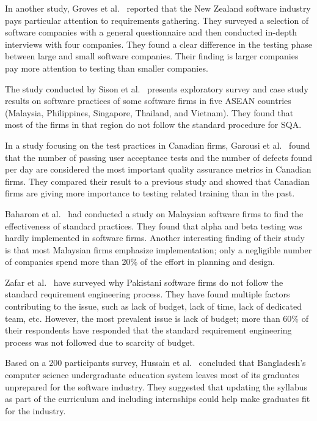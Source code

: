 In another study, Groves et al.~\cite{Groves2000} reported that the New Zealand software industry pays particular attention to requirements gathering. They surveyed a selection of software companies with a general questionnaire and then conducted in-depth interviews with four companies. They found a clear difference in the testing phase between large and small software companies. Their finding is larger companies pay more attention to testing than smaller companies.

The study conducted by Sison et al.~\cite{Sison2006} presents exploratory survey and case study results on software practices of some software firms in five ASEAN countries (Malaysia, Philippines, Singapore, Thailand, and Vietnam). They found that most of the firms in that region do not follow the standard procedure for SQA.

In a study focusing on the test practices in Canadian firms, Garousi et al.~\cite{Garousi2013} found that the number of passing user acceptance tests and the number of defects found per day are considered the most important quality assurance metrics in Canadian firms. They compared their result to a previous study and showed that Canadian firms are giving more importance to testing related training than in the past.

Baharom et al.~\cite{Baharom2006} had conducted a study on Malaysian software firms to find the effectiveness of standard practices. They found that alpha and beta testing was hardly implemented in software firms. Another interesting finding of their study is that most Malaysian firms emphasize implementation; only a negligible number of companies spend more than 20\% of the effort in planning and design.

Zafar et al.~\cite{Zafar2018} have surveyed why Pakistani software firms do not follow the standard requirement engineering process. They have found multiple factors contributing to the issue, such as lack of budget, lack of time, lack of dedicated team, etc. However, the most prevalent issue is lack of budget; more than 60\% of their respondents have responded that the standard requirement engineering process was not followed due to scarcity of budget.

Based on a 200 participants survey, Hussain et al.~\cite{Hussain2020} concluded that Bangladesh's computer science undergraduate education system leaves most of its graduates unprepared for the software industry. They suggested that updating the syllabus as part of the curriculum and including internships could help make graduates fit for the industry.


